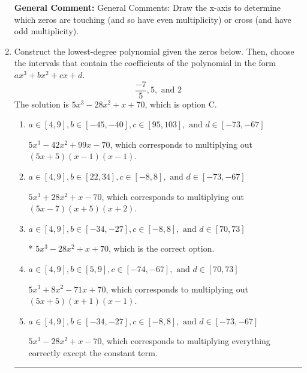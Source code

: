 \documentclass{extbook}[14pt]
\newcommand{\litem}[1]{\item #1

\rule{\textwidth}{0.4pt}}
\begin{document}
\begin{enumerate}
{\textbf{General Comment:} General Comments: Draw the x-axis to determine which zeros are touching (and so have even multiplicity) or cross (and have odd multiplicity).
}
\litem{
Construct the lowest-degree polynomial given the zeros below. Then, choose the intervals that contain the coefficients of the polynomial in the form $ax^3+bx^2+cx+d$.
\[ \frac{-7}{5}, 5, \text{ and } 2 \]
The solution is \( 5x^{3} -28 x^{2} +x + 70 \), which is option C.\begin{enumerate}[label=\Alph*.]
\item \( a \in [4, 9], b \in [-45, -40], c \in [95, 103], \text{ and } d \in [-73, -67] \)

$5x^{3} -42 x^{2} +99 x -70$, which corresponds to multiplying out $(5x + 5)(x -1)(x -1)$.
\item \( a \in [4, 9], b \in [22, 34], c \in [-8, 8], \text{ and } d \in [-73, -67] \)

$5x^{3} +28 x^{2} +x -70$, which corresponds to multiplying out $(5x -7)(x + 5)(x + 2)$.
\item \( a \in [4, 9], b \in [-34, -27], c \in [-8, 8], \text{ and } d \in [70, 73] \)

* $5x^{3} -28 x^{2} +x + 70$, which is the correct option.
\item \( a \in [4, 9], b \in [5, 9], c \in [-74, -67], \text{ and } d \in [70, 73] \)

$5x^{3} +8 x^{2} -71 x + 70$, which corresponds to multiplying out $(5x + 5)(x + 1)(x -1)$.
\item \( a \in [4, 9], b \in [-34, -27], c \in [-8, 8], \text{ and } d \in [-73, -67] \)

$5x^{3} -28 x^{2} +x -70$, which corresponds to multiplying everything correctly except the constant term.
\end{enumerate}

}
\end{enumerate}
\end{document}
